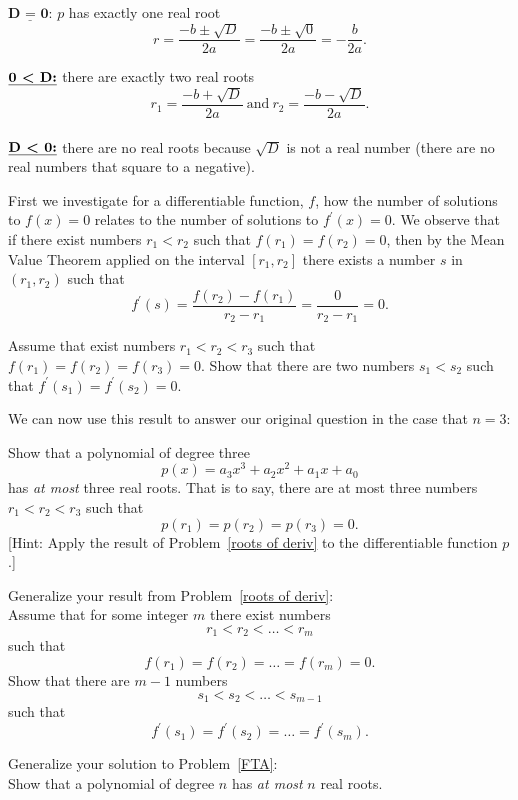 \documentclass[10pt]{amsart}
\begin{document}
\noindent
\(\underline{\textbf{D = 0:}}\) \(p\) has exactly one real root
\[r = \frac{-b \pm \sqrt{D}}{2a} = \frac{-b \pm \sqrt{0}}{2a} = -\frac{b}{2a}.\]

\noindent
\(\underline{\textbf{0 \textless\ D:}}\) there are exactly two real roots
\[r_1 = \frac{-b + \sqrt{D}}{2a}\ \text{and}\ r_2 = \frac{-b - \sqrt{D}}{2a}.\]\\

\noindent
\(\underline{\textbf{D \textless\ 0:}}\) there are no real roots because \(\sqrt{D}\) is not a real number (there are no real numbers that square to a negative).

First we investigate for a differentiable function, \(f\), how the number of solutions to \(f(x) = 0\) relates to the number of solutions to \(f^\prime(x) = 0\).
We observe that if there exist numbers \(r_1 < r_2\) such that \(f(r_1) = f(r_2) = 0\), then by the Mean Value Theorem applied on the interval \([r_1, r_2]\) there exists a number \(s\) in \((r_1, r_2)\) such that
\[f^\prime(s) = \frac{f(r_2) - f(r_1)}{r_2 - r_1} = \frac{0}{r_2 - r_1} = 0.\]

\newpage

\begin{thm}\label{roots of deriv}
  Assume that exist numbers \(r_1 < r_2 < r_3\) such that \(f(r_1) = f(r_2) = f(r_3) = 0\).
  Show that there are two numbers \(s_1 < s_2\) such that \(f^\prime(s_1) = f^\prime(s_2) = 0\).
\end{thm}
\vspace{3in}

\noindent We can now use this result to answer our original question in the case that \(n = 3\):
\begin{thm}\label{FTA}
  Show that a polynomial of degree three
  \[p(x) = a_3x^3 + a_2x^2 + a_1x +a_0\]
  has \textit{at most} three real roots.
  That is to say, there are at most three numbers \(r_1 < r_2 < r_3\) such that
  \[p(r_1) = p(r_2) = p(r_3) = 0.\]
     {[Hint: Apply the result of Problem~\ref{roots of deriv} to the differentiable function \(p\).]}
\end{thm}

\newpage

\begin{thm}
  Generalize your result from Problem~\ref{roots of deriv}:\\

  \noindent Assume that for some integer \(m\) there exist numbers
    \[r_1 < r_2 < \ldots < r_m\]
    such that
    \[f(r_1) = f(r_2) = \ldots = f(r_m) = 0.\]
    Show that there are \(m-1\) numbers
    \[s_1 < s_2 < \ldots < s_{m-1}\]
    such that
    \[f^\prime(s_1) = f^\prime(s_2) = \ldots = f^\prime(s_m).\]
\end{thm}
\vspace{4in}
\begin{thm}
  Generalize your solution to Problem~\ref{FTA}:\\
  
  \noindent Show that a polynomial of degree \(n\) has \textit{at most} \(n\) real roots.
\end{thm}
\end{document}
